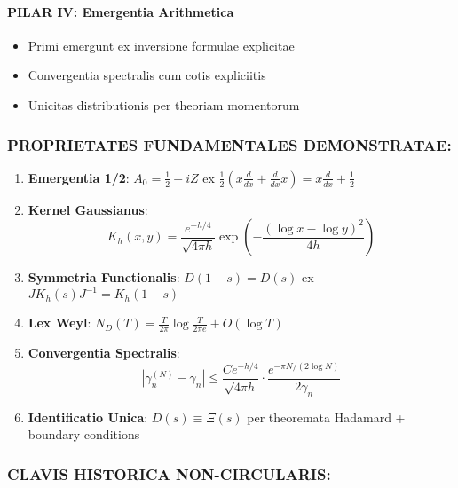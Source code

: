\paragraph{PILAR IV: Emergentia Arithmetica}
\begin{itemize}
\item Primi emergunt ex inversione formulae explicitae
\item Convergentia spectralis cum cotis expliciitis
\item Unicitas distributionis per theoriam momentorum
\end{itemize}

\subsubsection*{PROPRIETATES FUNDAMENTALES DEMONSTRATAE:}

\begin{enumerate}
\item \textbf{Emergentia 1/2}: $A_0 = \frac{1}{2} + iZ$ ex $\frac{1}{2}(x\frac{d}{dx} + \frac{d}{dx}x) = x\frac{d}{dx} + \frac{1}{2}$

\item \textbf{Kernel Gaussianus}: 
\[
K_h(x,y) = \frac{e^{-h/4}}{\sqrt{4\pi h}} \exp\left(-\frac{(\log x - \log y)^2}{4h}\right)
\]

\item \textbf{Symmetria Functionalis}: $D(1-s) = D(s)$ ex $J K_h(s) J^{-1} = K_h(1-s)$

\item \textbf{Lex Weyl}: $N_D(T) = \frac{T}{2\pi} \log\frac{T}{2\pi e} + O(\log T)$

\item \textbf{Convergentia Spectralis}: 
\[
|\gamma_n^{(N)} - \gamma_n| \leq \frac{C e^{-h/4}}{\sqrt{4\pi h}} \cdot \frac{e^{-\pi N/(2\log N)}}{2\gamma_n}
\]

\item \textbf{Identificatio Unica}: $D(s) \equiv \Xi(s)$ per theoremata Hadamard + boundary conditions
\end{enumerate}

\subsubsection*{CLAVIS HISTORICA NON-CIRCULARIS:}

